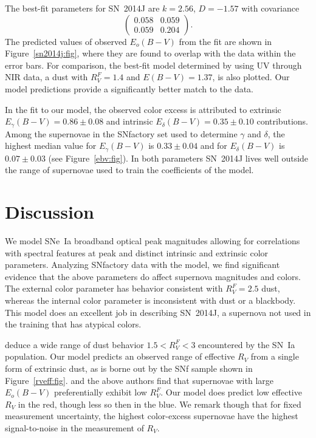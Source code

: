 \documentclass{aastex}   	%
\begin{document}
The best-fit parameters for SN~2014J are $k= 2.56$, $ D=-1.57$ with covariance
\begin{equation}
\begin{pmatrix}
0.058 & 0.059 \\
0.059 & 0.204
\end{pmatrix}.
\end{equation}
The predicted values of observed $E_o(B-V)$ from the fit are shown in Figure~\ref{sn2014j:fig}, where they are found to
overlap with the data within the error bars.   For comparison, the best-fit model determined by  \citet{2014ApJ...788L..21A} using
UV through NIR data,
a  \citet{1999PASP..111...63F} dust with $R_V^F=1.4$ and $E(B-V)=1.37$, 
is also plotted.  Our model predictions provide a significantly better match to the data.

In the fit to our model, the observed color excess is attributed to   extrinsic
$E_\gamma(B-V)=  0.86 \pm   0.08$ and intrinsic $E_\delta(B-V)=  0.35 \pm   0.10$ contributions.
Among the supernovae in the SNfactory  set used to determine $\gamma$ and $\delta$, the highest median value for 
$E_\gamma(B-V)$ is $  0.33 \pm 0.04$ and for $E_\delta(B-V)$ is
$  0.07 \pm 0.03$ 
(see Figure~\ref{ebv:fig}).
In both parameters SN~2014J lives well outside the range of supernovae used to train the coefficients of the model.

\section{Discussion}
\label{discussion:sec}
We model SNe~Ia broadband optical peak magnitudes allowing for correlations with spectral features at peak and distinct intrinsic and
extrinsic color parameters.  Analyzing SNfactory data with the model, we find significant evidence that the above parameters do
affect supernova magnitudes and colors.  The external color parameter has behavior consistent with $R^F_V=2.5$ \citet{1999PASP..111...63F} dust,
whereas the internal color parameter is inconsistent with dust or a blackbody.  This model  does an excellent job in
describing SN~2014J, a supernova not used in the training that has atypical colors.

\citet{2014ApJ...789...32B, 2015MNRAS.453.3300A} deduce a wide range of dust behavior $1.5<R^F_V<3$ encountered by the SN~Ia population.
Our model predicts an observed range of effective $R_V$ from a single form of extrinsic dust, as is borne out by the
SNf sample shown in Figure~\ref{rveff:fig}. 
\citet{2011ApJ...731..120M, 2011ApJ...729...55F} and the above authors
find that supernovae with large $E_o(B-V)$ 
preferentially exhibit low $R^F_V$. 
Our model does predict low effective $R_V$ in the red, though less so then in the blue.  
We remark though that for fixed measurement uncertainty, the highest color-excess supernovae have the highest signal-to-noise
in the measurement of $R_V$.
\end{document}
